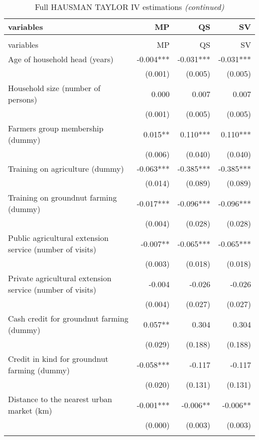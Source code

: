 \documentclass[
]{article}
\begin{document}
\begingroup\fontsize{7}{9}\selectfont

\begin{longtable}[t]{lrrr}
\caption{\label{tab:unnamed-chunk-20}Full HAUSMAN TAYLOR IV estimations}\\
\toprule
variables & MP & QS & SV\\
\midrule
\endfirsthead
\caption[]{\label{tab:unnamed-chunk-20}Full HAUSMAN TAYLOR IV estimations \textit{(continued)}}\\
\toprule
variables & MP & QS & SV\\
\midrule
\endhead

\endfoot
\bottomrule
\endlastfoot
Age of household head (years) & -0.004*** & -0.031*** & -0.031***\\
 & (0.001) & (0.005) & (0.005)\\
Household size (number of persons) & 0.000 & 0.007 & 0.007\\
 & (0.001) & (0.005) & (0.005)\\
Farmers group membership (dummy) & 0.015** & 0.110*** & 0.110***\\
\addlinespace
 & (0.006) & (0.040) & (0.040)\\
Training on agriculture (dummy) & -0.063*** & -0.385*** & -0.385***\\
 & (0.014) & (0.089) & (0.089)\\
Training on groundnut farming (dummy) & -0.017*** & -0.096*** & -0.096***\\
 & (0.004) & (0.028) & (0.028)\\
\addlinespace
Public agricultural extension service (number of visits) & -0.007** & -0.065*** & -0.065***\\
 & (0.003) & (0.018) & (0.018)\\
Private agricultural extension service (number of visits) & -0.004 & -0.026 & -0.026\\
 & (0.004) & (0.027) & (0.027)\\
Cash credit for groundnut farming (dummy) & 0.057** & 0.304 & 0.304\\
\addlinespace
 & (0.029) & (0.188) & (0.188)\\
Credit in kind for groundnut farming (dummy) & -0.058*** & -0.117 & -0.117\\
 & (0.020) & (0.131) & (0.131)\\
Distance to the nearest urban market (km) & -0.001*** & -0.006** & -0.006**\\
 & (0.000) & (0.003) & (0.003)\\
\addlinespace

\end{longtable}
\end{document}
